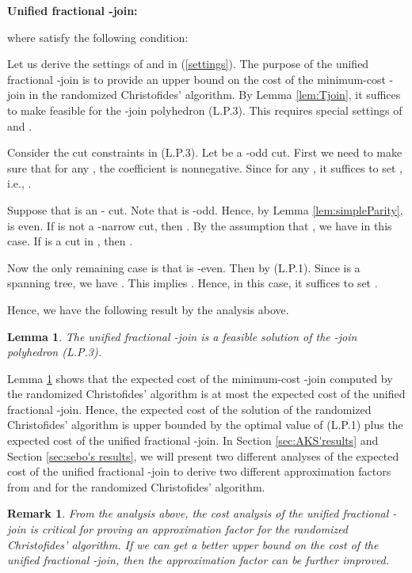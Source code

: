 \documentclass[11pt]{article}
\newtheorem{lemma}[theorem]{Lemma}
\newtheorem{remark}[theorem]{Remark}
\begin{document}
\medskip

\noindent \textbf{Unified fractional -join: }	

where  satisfy the following condition:


Let us derive the settings of  and  in (\ref{settings}).
The purpose of the unified fractional -join  is to provide an upper bound on the cost of the minimum-cost -join  in the
randomized Christofides' algorithm. By Lemma \ref{lem:Tjoin}, it suffices to make  feasible
for the -join polyhedron (L.P.3). This requires special settings of  and .

Consider the cut constraints in (L.P.3). Let  be a -odd cut. First we need to make sure that for any
, the coefficient  is nonnegative. Since  for any , it
suffices to set , i.e., .


Suppose that  is an - cut.
Note that  is -odd.
Hence, by Lemma \ref{lem:simpleParity},  is even.
If  is not a -narrow cut, then
. By the assumption that , we have  in this case.
If  is a cut in , then .

Now the only remaining case is that  is -even. Then  by (L.P.1).
Since  is a spanning tree, we have .
This implies . Hence, in this case,
it suffices to set .

Hence, we have the following result by the analysis above.

\begin{lemma}\label{lem:feasible}
The unified fractional -join  is
a feasible solution of the -join polyhedron (L.P.3).
\end{lemma}

Lemma \ref{lem:feasible} shows that the expected cost of the minimum-cost -join  computed by
the randomized Christofides' algorithm is
at most the expected cost of the unified fractional -join. Hence, the expected cost of the solution of the randomized
Christofides' algorithm is upper bounded by the optimal value of (L.P.1) plus the expected cost of the
unified fractional -join.  In Section \ref{sec:AKS'results} and Section \ref{sec:sebo's results}, we will present two different analyses of the
expected cost of the unified fractional -join to derive two different approximation factors from \cite{AKS12} and \cite{sebo13} for the randomized
Christofides' algorithm.


\begin{remark}
From the analysis above,  the cost analysis of the
unified fractional -join is critical for proving
an approximation factor for the randomized Christofides' algorithm.
If we can get a better upper bound on the cost of the unified fractional -join,
then the approximation factor can be further improved.
\end{remark}
\end{document}
